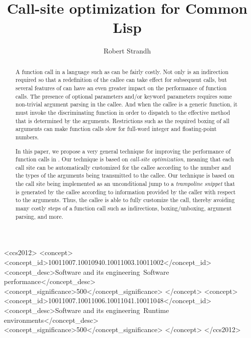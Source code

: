 \documentclass[format=sigconf,review]{acmart}
\begin{document}
\title{Call-site optimization for Common Lisp}

\author{Robert Strandh}


\begin{abstract}
A function call in a language such as \commonlisp{} can be fairly
costly.  Not only is an indirection required so that a redefinition of
the callee can take effect for subsequent calls, but several features
of \commonlisp{} can have an even greater impact on the performance of
function calls.  The presence of optional parameters and/or keyword
parameters requires some non-trivial argument parsing in the callee.
And when the callee is a generic function, it must invoke the
discriminating function in order to dispatch to the effective
method that is determined by the arguments.  Restrictions such as the
required boxing of all arguments can make function calls slow for
full-word integer and floating-point numbers.

In this paper, we propose a very general technique for improving the
performance of function calls in \commonlisp{}.  Our technique is
based on \emph{call-site optimization}, meaning that each call site
can be automatically customized for the callee according to the number
and the types of the arguments being transmitted to the callee.  Our
technique is based on the call site being implemented as an
unconditional jump to a \emph{trampoline snippet} that is generated by
the callee according to information provided by the caller with
respect to the arguments.  Thus, the callee is able to fully customize
the call, thereby avoiding many costly steps of a function call such
as indirections, boxing/unboxing, argument parsing, and more.
\end{abstract}

\begin{CCSXML}
<ccs2012>
<concept>
<concept_id>10011007.10010940.10011003.10011002</concept_id>
<concept_desc>Software and its engineering~Software performance</concept_desc>
<concept_significance>500</concept_significance>
</concept>
<concept>
<concept_id>10011007.10011006.10011041.10011048</concept_id>
<concept_desc>Software and its engineering~Runtime environments</concept_desc>
<concept_significance>500</concept_significance>
</concept>
</ccs2012>
\end{CCSXML}
\end{document}

